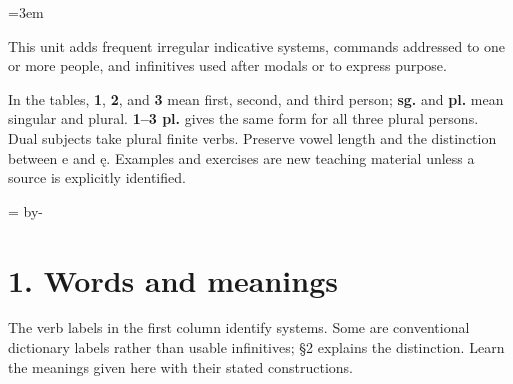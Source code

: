 \newcommand{\runningtitle}{Unit 6. Irregular verbs}

\emergencystretch=3em
\newcommand{\itempara}[2]{\par\addvspace{3pt}\noindent\hangindent=1.8em\hangafter=1\makebox[1.8em][l]{#1.}#2\par}
\newcommand{\reserve}[1]{\par\penalty-100\begingroup\dimen0=\pagegoal\advance\dimen0 by-\pagetotal\ifdim\dimen0<#1\newpage\fi\endgroup}

\raggedright
{}

This unit adds frequent irregular indicative systems, commands addressed to one or more people, and infinitives used after modals or to express purpose.

In the tables, \textbf{1}, \textbf{2}, and \textbf{3} mean first, second, and third person; \textbf{sg.} and \textbf{pl.} mean singular and plural. \textbf{1–3 pl.} gives the same form for all three plural persons. Dual subjects take plural finite verbs. Preserve vowel length and the distinction between e and ę. Examples and exercises are new teaching material unless a source is explicitly identified.

\reserve{7\baselineskip}
\section*{1. Words and meanings}

The verb labels in the first column identify systems. Some are conventional dictionary labels rather than usable infinitives; §2 explains the distinction. Learn the meanings given here with their stated constructions.

